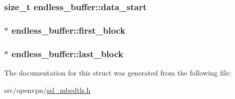 \subsubsection[{data\+\_\+start}]{\setlength{\rightskip}{0pt plus 5cm}size\+\_\+t endless\+\_\+buffer\+::data\+\_\+start}\label{structendless__buffer_a54a1e7a82ef3247b40f91e041ca80ba1}
\hypertarget{structendless__buffer_a67832b7fe99230c26191497d63057c19}{}
\subsubsection[{first\+\_\+block}]{$\ast$ endless\+\_\+buffer\+::first\+\_\+block}\label{structendless__buffer_a67832b7fe99230c26191497d63057c19}
\hypertarget{structendless__buffer_a9bd4f8a71a81da83cf655f6c3ce30f51}{}
\subsubsection[{last\+\_\+block}]{$\ast$ endless\+\_\+buffer\+::last\+\_\+block}\label{structendless__buffer_a9bd4f8a71a81da83cf655f6c3ce30f51}


The documentation for this struct was generated from the following file\+:\begin{DoxyCompactItemize}
\item 
src/openvpn/\hyperlink{ssl__mbedtls_8h}{ssl\+\_\+mbedtls.\+h}\end{DoxyCompactItemize}
